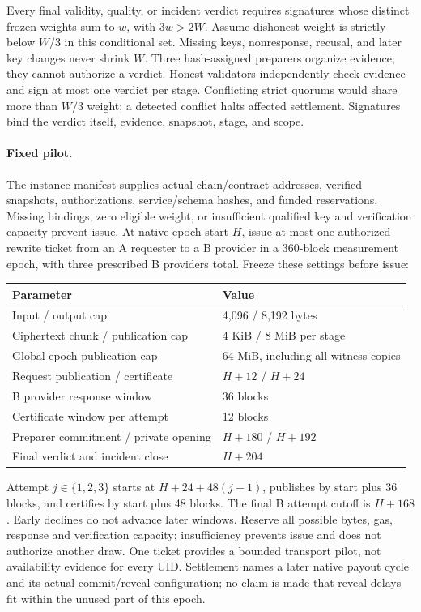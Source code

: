Every final validity, quality, or incident verdict requires signatures
whose distinct frozen weights sum to \(w\), with \(3w>2W\). Assume
dishonest weight is strictly below \(W/3\) in this conditional set.
Missing keys, nonresponse, recusal, and later key changes never shrink
\(W\). Three hash-assigned preparers organize evidence; they cannot
authorize a verdict. Honest validators independently check evidence and
sign at most one verdict per stage. Conflicting strict quorums would share
more than \(W/3\) weight; a detected conflict halts affected settlement.
Signatures bind the verdict itself, evidence, snapshot, stage, and scope.

\paragraph{Fixed pilot.}
The instance manifest supplies actual chain/contract addresses, verified
snapshots, authorizations, service/schema hashes, and funded reservations.
Missing bindings, zero eligible weight, or insufficient qualified key and
verification capacity prevent issue. At native epoch start \(H\), issue at most
one authorized rewrite ticket from an A requester to a B provider in a
360-block measurement epoch, with three prescribed B providers total.
Freeze these settings before issue:

\begin{center}
\begin{tabular}{@{}ll@{}}
\toprule
Parameter & Value \\
\midrule
Input / output cap & 4,096 / 8,192 bytes \\
Ciphertext chunk / publication cap & 4 KiB / 8 MiB per stage \\
Global epoch publication cap & 64 MiB, including all witness copies \\
Request publication / certificate & \(H+12\) / \(H+24\) \\
B provider response window & 36 blocks \\
Certificate window per attempt & 12 blocks \\
Preparer commitment / private opening & \(H+180\) / \(H+192\) \\
Final verdict and incident close & \(H+204\) \\
\bottomrule
\end{tabular}
\end{center}

Attempt \(j\in\{1,2,3\}\) starts at
\(H+24+48(j-1)\), publishes by start plus 36 blocks, and certifies by
start plus 48 blocks. The final B attempt cutoff is \(H+168\).
Early declines do not advance later windows. Reserve all possible bytes,
gas, response and verification capacity; insufficiency prevents issue and
does not authorize another draw. One ticket provides a bounded transport
pilot, not availability evidence for every UID. Settlement names a later
native payout cycle and its actual commit/reveal configuration; no claim
is made that reveal delays fit within the unused part of this epoch.

